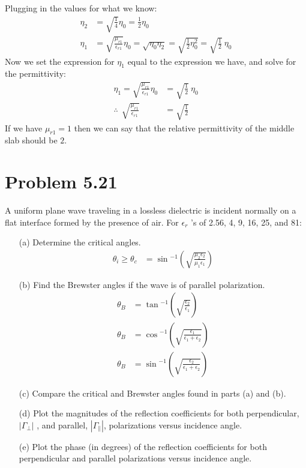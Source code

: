 \documentclass[12pt]{article}
\begin{document}
Plugging in the values for what we know:
\begin{align*}
  \eta_2 &= \sqrt{\frac{1}{4}}\eta_0 = \frac{1}{2}\eta_0\\
  \eta_1 &= \sqrt{\frac{\mu_{r1}}{\epsilon_{r1}}}\eta_0 = \sqrt{\eta_0\eta_2} = \sqrt{\frac{1}{2}\eta_0^2} = \sqrt{\frac{1}{2}}\ \eta_0
\end{align*}
Now we set the expression for $\eta_1$ equal to the expression we have, and solve for the permittivity:
\begin{align*}
  \eta_1 = \sqrt{\frac{\mu_{r1}}{\epsilon_{r1}}}\eta_0 &= \sqrt{\frac{1}{2}}\ \eta_0\\
  \therefore\ \ \sqrt{\frac{\mu_{r1}}{\epsilon_{r1}}} &= \sqrt{\frac{1}{2}}
\end{align*}
If we have $\mu_{r1} = 1$ then we can say that the relative permittivity of the middle slab should be $2$.
\section*{Problem 5.21}
A uniform plane wave traveling in a lossless dielectric is incident normally on a flat interface formed by the presence of air. For $\epsilon_r$ ’s of 2.56, 4, 9, 16, 25, and 81:
\begin{itemize}
\item[(a)] Determine the critical angles.\\
  \begin{align*}
    \theta_i \geq \theta_c &= \sin{^{-1}\left(\sqrt{\frac{\mu_2\epsilon_2}{\mu_1\epsilon_1}}\right)}
  \end{align*}
\item[(b)] Find the Brewster angles if the wave is of parallel polarization.
  \begin{align*}
    \theta_B &= \tan{^{-1}\left(\sqrt{\frac{\epsilon_2}{\epsilon_1}}\right)}\\
    \theta_B &= \cos{^{-1}\left(\sqrt{\frac{\epsilon_1}{\epsilon_1 + \epsilon_2}}\right)}\\
    \theta_B &= \sin{^{-1}\left(\sqrt{\frac{\epsilon_2}{\epsilon_1 + \epsilon_2}}\right)}
  \end{align*}
\item[(c)] Compare the critical and Brewster angles found in parts (a) and (b).
\item[(d)] Plot the magnitudes of the reflection coefficients for both perpendicular, $|\Gamma_{\perp}|$ , and parallel, $|\Gamma_{\parallel}|$, polarizations versus incidence angle.
\item[(e)] Plot the phase (in degrees) of the reflection coefficients for both perpendicular
and parallel polarizations versus incidence angle.
\end{itemize}



\end{document}
